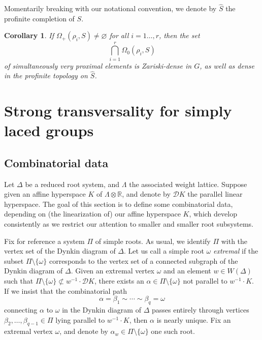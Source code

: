 \documentclass{amsart}
\theoremstyle{plain}
\newtheorem{corollary}[theorem]{Corollary}
\theoremstyle{definition}
\theoremstyle{remark}
\begin{document}
Momentarily breaking with our notational convention, we denote by $\widehat{S}$ the
profinite completion of $S$.
\begin{corollary}\label{cor:existenceanddensity}
If $\Omega_{+}(\rho_{i}, S) \neq \varnothing$ for all $i = 1\ldots, r$, then the set $$\bigcap_{i = 1}^{r}
\Omega_{0}(\rho_{i}, S)$$ of simultaneously very proximal elements is Zariski-dense in
$G$, as well as dense in the profinite topology on $\widehat{S}$.
\end{corollary}
\section{Strong transversality for simply laced groups}\label{sec:StrongTransversality}
\subsection{Combinatorial data}\label{sec:CD}
Let $\Delta$ be a reduced root system, and $\Lambda$ the
associated weight lattice. Suppose given an affine hyperspace $K$ of $\Lambda \otimes
\mathbb{R}$, and denote by $\mathscr{D}K$ the parallel linear hyperspace. The goal of
this section is to define some combinatorial data, depending on (the linearization of) our
affine hyperspace $K$, which develop consistently as
we restrict our attention to smaller and smaller root subsystems. 

Fix for reference a system $\Pi$ of simple roots. As usual, we
identify $\Pi$ with the vertex set of the Dynkin diagram of $\Delta$.
Let us call a simple root $\omega$ \emph{extremal} if the subset $\Pi \setminus \{\omega\}$
corresponds to the vertex set of a connected subgraph of the Dynkin diagram of $\Delta$.
Given an extremal vertex $\omega$ and an element $w \in W(\Delta)$ such that $\Pi \setminus \{\omega\} \not \subset w^{-1} \cdot \mathscr{D}K$,
there exists an $\alpha \in \Pi \setminus \{\omega\}$
not parallel to $w^{-1} \cdot K$. If we insist that the combinatorial path
$$
\alpha = \beta_{1} \sim \cdots \sim \beta_{q} = \omega
$$
connecting $\alpha$ to $\omega$ in the Dynkin diagram of $\Delta$ passes entirely
through vertices $\beta_{2}, \ldots, \beta_{q - 1} \in \Pi$ lying parallel to $w^{-1} \cdot
K$, then $\alpha$ is nearly unique. Fix an extremal vertex $\omega$, and denote by $\alpha_{w} \in \Pi \setminus \{\omega\}$ one such 
root.
\end{document}
